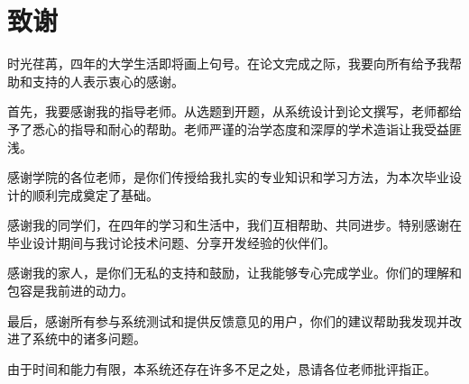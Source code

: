 \newpage
\section*{致\quad 谢}

时光荏苒，四年的大学生活即将画上句号。在论文完成之际，我要向所有给予我帮助和支持的人表示衷心的感谢。

首先，我要感谢我的指导老师。从选题到开题，从系统设计到论文撰写，老师都给予了悉心的指导和耐心的帮助。老师严谨的治学态度和深厚的学术造诣让我受益匪浅。

感谢学院的各位老师，是你们传授给我扎实的专业知识和学习方法，为本次毕业设计的顺利完成奠定了基础。

感谢我的同学们，在四年的学习和生活中，我们互相帮助、共同进步。特别感谢在毕业设计期间与我讨论技术问题、分享开发经验的伙伴们。

感谢我的家人，是你们无私的支持和鼓励，让我能够专心完成学业。你们的理解和包容是我前进的动力。

最后，感谢所有参与系统测试和提供反馈意见的用户，你们的建议帮助我发现并改进了系统中的诸多问题。

由于时间和能力有限，本系统还存在许多不足之处，恳请各位老师批评指正。
